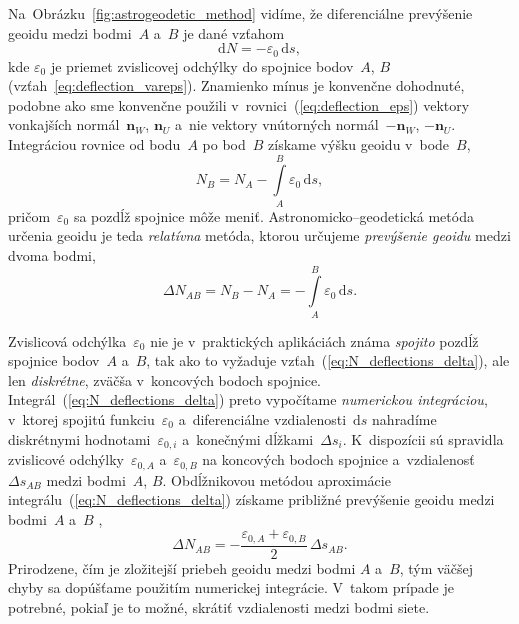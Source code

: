\documentclass[a4paper, 12pt]{book}
\newcommand{\diff}{\mathrm d}
\let\vec\mathbf
\begin{document}
Na~Obrázku~\ref{fig:astrogeodetic_method} vidíme, že diferenciálne prevýšenie 
geoidu medzi bodmi~$A$ a~$B$ je dané vzťahom \parencite{MoritzPhysicalGeodesy}
%
\begin{equation}
\label{eq:N_deflections}
\diff N = -\varepsilon_0 \, \diff s{,}
\end{equation}
%
kde $\varepsilon_0$ je priemet zvislicovej odchýlky do spojnice bodov~$A$, $B$ 
(vzťah~\ref{eq:deflection_vareps}).  Znamienko mínus je konvenčne dohodnuté, 
podobne ako sme konvenčne použili v~rovnici~(\ref{eq:deflection_eps}) vektory 
vonkajších normál~$\vec n_W$, $\vec n_U$ a~nie vektory vnútorných normál~$-\vec 
n_W$, $-\vec n_U$.  Integráciou rovnice od bodu~$A$ po bod~$B$ získame výšku 
geoidu v~bode~$B$,
%
\begin{equation}
\label{eq:N_deflections_nb}
N_B = N_A - \int\limits_A^B \varepsilon_0 \, \diff s{,}
\end{equation}
%
pričom~$\varepsilon_0$ sa pozdĺž spojnice môže meniť.  Astronomicko--geodetická 
metóda určenia geoidu je teda \emph{relatívna} metóda, ktorou určujeme 
\emph{prevýšenie geoidu} medzi dvoma bodmi,
%
\begin{equation}
\label{eq:N_deflections_delta}
\Delta N_{AB} = N_B - N_A = - \int\limits_A^B \varepsilon_0 \, \diff s{.}
\end{equation}

Zvislicová odchýlka~$\varepsilon_0$ nie je v~praktických aplikáciách známa 
\emph{spojito} pozdĺž spojnice bodov~$A$ a~$B$, tak ako to vyžaduje 
vzťah~(\ref{eq:N_deflections_delta}), ale len \emph{diskrétne}, zväčša 
v~koncových bodoch spojnice.  Integrál~(\ref{eq:N_deflections_delta}) preto 
vypočítame \emph{numerickou integráciou}, v~ktorej spojitú 
funkciu~$\varepsilon_0$ a~diferenciálne vzdialenosti~$\diff s$ nahradíme 
diskrétnymi hodnotami~$\varepsilon_{0,i}$ a~konečnými dĺžkami~$\Delta s_i$.  
K~dispozícii sú spravidla zvislicové odchýlky~$\varepsilon_{0,A}$ 
a~$\varepsilon_{0,B}$ na koncových bodoch spojnice a~vzdialenosť~$\Delta 
s_{AB}$ medzi bodmi~$A$, $B$.  Obdĺžnikovou metódou aproximácie 
integrálu~(\ref{eq:N_deflections_delta}) získame približné prevýšenie geoidu 
medzi bodmi~$A$ a~$B$ \parencite[pre popis obdĺžnikovej metódy pozri 
napríklad][]{Macak2021},
%
\begin{equation}
\label{eq:N_deflections_delta_ni}
\Delta N_{AB} = -\frac{\varepsilon_{0,A} + \varepsilon_{0,B}}{2} \, \Delta 
s_{AB}{.}
\end{equation}
%
Prirodzene, čím je zložitejší priebeh geoidu medzi bodmi $A$ a~$B$, tým väčšej 
chyby sa dopúšťame použitím numerickej integrácie.  V~takom prípade je 
potrebné, pokiaľ je to možné, skrátiť vzdialenosti medzi bodmi siete.
\end{document}
